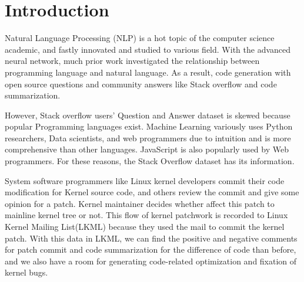 \section{Introduction}
\noindent
Natural Language Processing (NLP) is a hot topic of the computer science
academic, and fastly innovated and studied to
various field. With the advanced neural network, much prior
work investigated the relationship between programming
language and natural language. As a result, code generation
with open source questions and community answers like
Stack overflow and code summarization.

However, Stack overflow users' Question and Answer dataset is skewed because
popular Programming languages exist. Machine Learning variously uses Python
researchers, Data scientists, and web programmers due
to intuition and is more comprehensive than other languages.
JavaScript is also popularly used by Web programmers. For
these reasons, the Stack Overflow dataset has its information.

System software programmers like Linux kernel developers commit their code
modification for Kernel source code, and others review the commit and give some
opinion for a patch. Kernel maintainer decides whether affect
this patch to mainline kernel tree or not. This flow of kernel
patchwork is recorded to Linux Kernel Mailing List(LKML)
because they used the mail to commit the kernel patch.
With this data in LKML, we can find the positive and negative comments for patch
commit and code summarization
for the difference of code than before, and we also have a room
for generating code-related optimization and fixation of kernel bugs.

